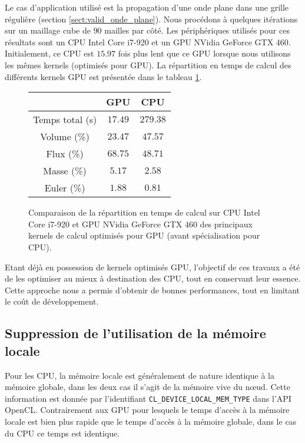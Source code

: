 Le cas d'application utilisé est la propagation d'une onde plane dans une grille régulière
(section \ref{sect:valid_onde_plane}).
Nous procédons à quelques itérations sur un maillage cube de $90$ mailles par côté.
Les périphériques utilisés pour ces résultats sont un
CPU Intel Core i7-920 et un GPU NVidia GeForce GTX 460.
Initialement, ce CPU est $15.97$ fois plus lent que ce GPU
lorsque nous utilisons les mêmes kernels (optimisés pour GPU).
La répartition en temps de calcul des différents kernels GPU est présentée
dans le tableau \ref{tab:comp_cpu_gpu_avant}.

\begin{figure}[!h]
	\begin{center}
		\caption{
			\label{tab:comp_cpu_gpu_avant}
			Comparaison de la répartition en temps de calcul sur CPU Intel Core i7-920 et GPU NVidia GeForce GTX 460 des
			principaux kernels
			de calcul optimisés pour GPU (avant spécialisation pour CPU).
		}
		
		\begin{tabular}{|c|c|c|}
			\hline
			 & GPU & CPU \\ \hline\hline
			Temps total (s) & $17.49$ & $279.38$ \\	\hline
			Volume (\%) & $23.47$ & $47.57$ \\	\hline
			Flux (\%) & $68.75$ & $48.71$ \\	\hline
			Masse (\%) & $5.17$ & $2.58$ \\	\hline
			Euler (\%) & $1.88$ & $0.81$ \\	\hline
		\end{tabular}
	\end{center}
\end{figure}

Etant déjà en possession de kernels optimisés GPU, l'objectif
de ces travaux a été de les optimiser au mieux à destination
des CPU, tout en conservant leur essence.
Cette approche nous a permis d'obtenir de bonnes performances,
tout en limitant le coût de développement.
\\


\subsection{Suppression de l'utilisation de la mémoire locale}
\label{ssect:cpu_suppr_memoire_locale}


Pour les CPU, la mémoire locale est généralement
de nature identique à la mémoire globale, dans les deux cas il s'agit
de la mémoire vive du nœud.
Cette information est donnée par l'identifiant \verb|CL_DEVICE_LOCAL_MEM_TYPE|
dans l'API OpenCL.
Contrairement aux GPU pour lesquels le temps d'accès à la mémoire
locale est bien plus rapide que le temps d'accès à la mémoire globale,
dans le cas du CPU ce temps est identique.

